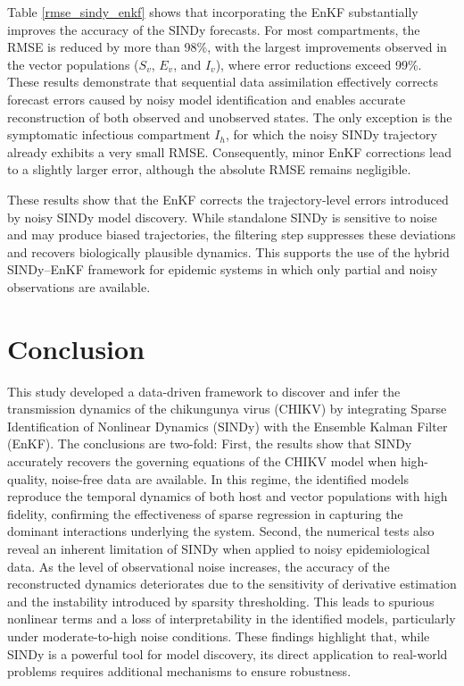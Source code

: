 \documentclass[9pt]{article}
\numberwithin{equation}{section}
\begin{document}
Table \ref{rmse_sindy_enkf} shows that incorporating the EnKF substantially improves the accuracy of the SINDy forecasts. For most compartments, the RMSE is reduced by more than 98\%, with the largest improvements observed in the vector populations ($S_v$, $E_v$, and $I_v$), where error reductions exceed 99\%. These results demonstrate that sequential data assimilation effectively corrects forecast errors caused by noisy model identification and enables accurate reconstruction of both observed and unobserved states. The only exception is the symptomatic infectious compartment $I_h$, for which the noisy SINDy trajectory already exhibits a very small RMSE. Consequently, minor EnKF corrections lead to a slightly larger error, although the absolute RMSE remains negligible.

These results show that the EnKF corrects the trajectory-level errors introduced by noisy SINDy model discovery. While standalone SINDy is sensitive to noise and may produce biased trajectories, the filtering step suppresses these deviations and recovers biologically plausible dynamics. This supports the use of the hybrid SINDy--EnKF framework for epidemic systems in which only partial and noisy observations are available.

\section{Conclusion}\label{conclusion}
This study developed a data-driven framework to discover and infer the transmission dynamics of the chikungunya virus (CHIKV) by integrating Sparse Identification of Nonlinear Dynamics (SINDy) with the Ensemble Kalman Filter (EnKF). 
The conclusions are two-fold: First, the results show that SINDy accurately recovers the governing equations of the CHIKV model when high-quality, noise-free data are available. In this regime, the identified models reproduce the temporal dynamics of both host and vector populations with high fidelity, confirming the effectiveness of sparse regression in capturing the dominant interactions underlying the system. 
Second, the numerical tests also reveal an inherent limitation of SINDy when applied to noisy epidemiological data. As the level of observational noise increases, the accuracy of the reconstructed dynamics deteriorates due to the sensitivity of derivative estimation and the instability introduced by sparsity thresholding. This leads to spurious nonlinear terms and a loss of interpretability in the identified models, particularly under moderate-to-high noise conditions. These findings highlight that, while SINDy is a powerful tool for model discovery, its direct application to real-world problems requires additional mechanisms to ensure robustness.
\end{document}
